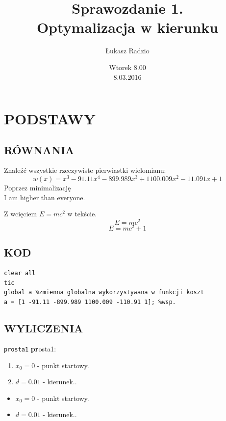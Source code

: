 \documentclass[11pt,a4paper]{article}
\author{Łukasz Radzio}
\title{Sprawozdanie 1.\\ Optymalizacja w kierunku }
\date{Wtorek 8.00\\8.03.2016}
\begin{document}
\maketitle
\section*{PODSTAWY}
\subsection*{RÓWNANIA}%
Znaleźć wszystkie rzeczywiste pierwiastki wielomianu:
\[w(x)=x^3-91.11x^4-899.989x^3+1100.009x^2-11.091x+1\]
Poprzez minimalizację
\newline %
\\ %
I am higher than everyone.

Z wcięciem $ E=mc^2 $ w tekście.
$$ E = mc^2 $$ %
\begin{equation} %
	E=mc^2 + 1
\end{equation}

\subsection*{KOD}
\begin{verbatim} 
clear all
tic
global a %zmienna globalna wykorzystywana w funkcji koszt
a = [1 -91.11 -899.989 1100.009 -110.91 1]; %wsp. 
\end{verbatim}

\subsection*{WYLICZENIA}
\texttt{prosta1} \textbf{pr}osta1:
\begin{enumerate}
	\item $x_{0}=0$ - punkt startowy.
	\item $d=0.01$ - kierunek..
\end{enumerate}
\begin{itemize}
	\item $x_{0}=0$ - punkt startowy.
	\item $d=0.01$ - kierunek..
\end{itemize}
\newpage
\end{document}
